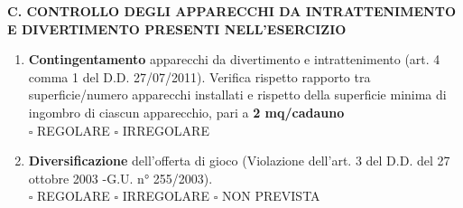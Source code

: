 \documentclass[12pt]{article}
\begin{document}
\newpage


\begin{center}
    \textbf{C. CONTROLLO DEGLI APPARECCHI DA INTRATTENIMENTO E DIVERTIMENTO PRESENTI NELL’ESERCIZIO}
\end{center}
\begin{enumerate}[resume]
    \item \textbf{Contingentamento} apparecchi da divertimento e intrattenimento (art. 4 comma 1 del D.D. 27/07/2011). Verifica rispetto rapporto tra superficie/numero apparecchi installati e rispetto della superficie minima di ingombro di ciascun apparecchio, pari a \textbf{2 mq/cadauno }
    \\\begin{math} \square\end{math} REGOLARE \begin{math}\square\end{math} IRREGOLARE
    \item \textbf{Diversificazione} dell’offerta di gioco (Violazione dell’art. 3 del D.D. del 27 ottobre 2003 -G.U. n° 255/2003).
    \\\begin{math} \square\end{math} REGOLARE \begin{math}\square\end{math} IRREGOLARE \begin{math}\square\end{math} NON PREVISTA
\end{enumerate}
\end{document}
